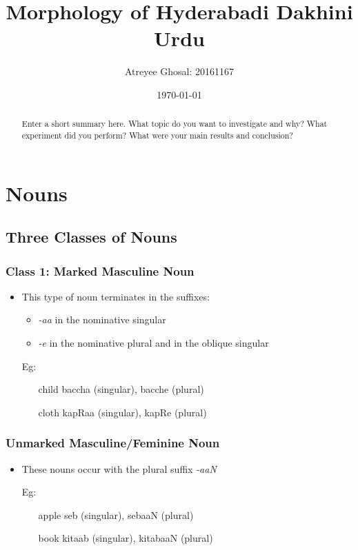 \documentclass[a4paper]{article}
\title{Morphology of Hyderabadi Dakhini Urdu}
\author{Atreyee Ghosal: 20161167}
\date{\today}
\begin{document}
\maketitle

\begin{abstract}
Enter a short summary here. What topic do you want to investigate and why? What experiment did you perform? What were your main results and conclusion?
\end{abstract}

\section{Nouns}

\subsection{Three Classes of Nouns}

\subsubsection{Class 1: Marked Masculine Noun}

\begin{itemize}
\item
This type of noun terminates in the suffixes:
	\begin{itemize}
	\item
	\emph{-aa} in the nominative singular
	\item
	\emph{-e} in the nominative plural and in the oblique singular
	\end{itemize}
\item[Eg:  ]
	\begin{itemize}
	\item[child]
	baccha (singular), bacche (plural)
	\item[cloth]
	kapRaa (singular), kapRe (plural)
	\end{itemize}
\end{itemize}

\subsubsection{Unmarked Masculine/Feminine Noun}

\begin{itemize}
\item 
These nouns occur with the plural suffix \emph{-aaN}
\item[Eg:  ]
	\begin{itemize}
	\item[apple]
	seb (singular), sebaaN (plural)
	\item[book]
	kitaab (singular), kitabaaN (plural) 
	\end{itemize}
\end{itemize}
\end{document}
